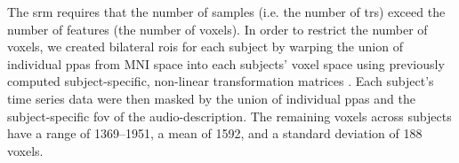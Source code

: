 






The \ac{srm} requires that the number of samples (i.e. the number of \acp{tr})
exceed the number of features (the number of voxels).
%
In order to restrict the number of voxels, we created bilateral \acp{roi} for
each subject by warping the union of individual \acp{ppa}
\citep[s.][]{haeusler2022processing} from MNI space into each subjects' voxel
space using previously computed subject-specific, non-linear transformation
matrices
\citep[][\href{https://github.com/psychoinformatics-de/studyforrest-data-templatetransforms
}{\url{github.com/psychoinformatics-de/studyforrest-data-templatetransforms}}]{hanke2014audiomovie}.
Each subject's time series data were then masked by the union of individual
\acp{ppa} and the subject-specific \ac{fov} of the audio-description.
The remaining voxels across subjects have a range of 1369--1951,
a mean of 1592, and a standard deviation of 188 voxels.

